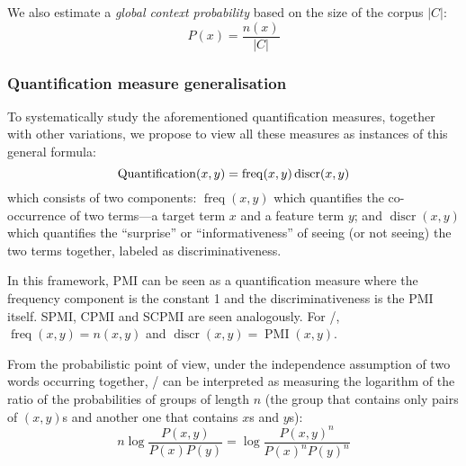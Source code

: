 We also estimate a \emph{global context probability} based on the size of the corpus $|C|$:
%
\begin{equation}
  \label{eq:cds-nan}
  P(x) = \frac{n(x)}{|C|}
\end{equation}

\subsubsection{Quantification measure generalisation}
\label{sec:quantification-measures}

To systematically study the aforementioned quantification measures, together with other variations, we propose to view all these measures as instances of this general formula:
%
\begin{equation}
  \small
  \label{eq:association}
  \operatorname{Quantification}(x,y) = \operatorname{freq}(x, y)
                                       \operatorname{discr}(x, y)
\end{equation}
%
which consists of two components: $\operatorname{freq}(x, y)$ which quantifies the co-occurrence of two terms---a target term $x$ and a feature term $y$; and $\operatorname{discr}(x, y)$ which quantifies the ``surprise'' or ``informativeness'' of seeing (or not seeing) the two terms together, labeled as discriminativeness.

In this framework, PMI can be seen as a quantification measure where the frequency component is the constant 1 and the discriminativeness is the PMI itself. SPMI, CPMI and SCPMI are seen analogously. For \NPMI/, $\operatorname{freq}(x, y) = n(x, y)$ and $\operatorname{discr}(x, y) = \operatorname{PMI}(x, y)$.

From the probabilistic point of view, under the independence assumption of two words occurring together, \NPMI/ can be interpreted as measuring the logarithm of the ratio of the probabilities of groups of length $n$ (the group that contains only pairs of $(x,y)$s and another one that contains $x$s and $y$s):
%
\begin{equation*}
  n\log\frac{P(x, y)}{P(x)P(y)} = \log\frac{P(x, y)^{n}}{P(x)^{n}P(y)^{n}}
\end{equation*}
%
%
%

